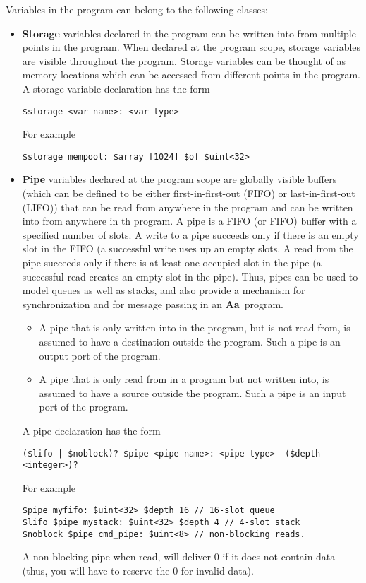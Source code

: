 \documentclass{article}
\newcommand{\Aa}{{\bf Aa}~}
\begin{document}
Variables in  the program can belong to the following classes:
\begin{itemize}
\item {\bf Storage} variables declared in the program
can be written into from multiple
points in the program.  When declared at the program
scope, storage variables are visible throughout
the program.  Storage variables can be thought of 
as memory locations which can be accessed from different
points in the program.
A storage variable declaration has the form
\begin{verbatim}
$storage <var-name>: <var-type> 
\end{verbatim}
For example
\begin{verbatim}
$storage mempool: $array [1024] $of $uint<32>
\end{verbatim}
\item {\bf Pipe} variables declared at the program scope
are globally visible buffers (which
can be defined to be either first-in-first-out (FIFO) or
last-in-first-out (LIFO)) that can 
be read from anywhere in the program and can be
written into from anywhere in th program.  A pipe
is a FIFO (or FIFO) buffer with a specified number of
slots.  A write to a pipe succeeds
only if there is an empty slot in the FIFO (a successful
write uses up an empty slots.  A read
from the pipe succeeds only if there is at
least one occupied slot in the pipe (a successful read
creates an empty slot in the pipe). 
Thus, pipes can be used to model queues as
well as stacks, and also provide a mechanism for synchronization and
for message passing in an \Aa program.
\begin{itemize}
\item A pipe that is only written into in the program, but
is not read from, is assumed to have a destination outside
the program.  Such a pipe is an output port of the
program.
\item A pipe that is only read from in a program but not
written into, is assumed to have a source outside the program.
Such a pipe is an input port of the program.
\end{itemize}
A pipe declaration has the form
\begin{verbatim}
($lifo | $noblock)? $pipe <pipe-name>: <pipe-type>  ($depth <integer>)?
\end{verbatim}
For example
\begin{verbatim}
$pipe myfifo: $uint<32> $depth 16 // 16-slot queue
$lifo $pipe mystack: $uint<32> $depth 4 // 4-slot stack
$noblock $pipe cmd_pipe: $uint<8> // non-blocking reads.
\end{verbatim}
A non-blocking pipe when read, will deliver $0$ if
it does not contain data (thus, you will have to reserve
the $0$ for invalid data).


\end{itemize}
\end{document}
